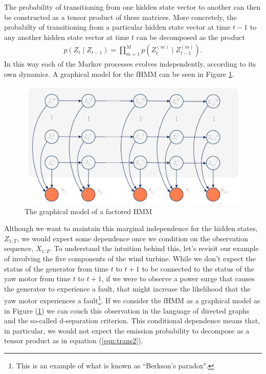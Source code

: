 \documentclass{amsart}
\begin{document}
The probability of transitioning from one hidden state vector to another can 
then be constructed as a tensor product of these matrices.  More concretely, 
the probabilty of transitioning from a particular hidden state vector at time 
$t-1$ to any another hidden state vector at time $t$ can be decomposed as the product
\begin{eqnarray}\label{eqn:trans2}
p(Z_t\mid Z_{t-1}) = \prod_{m=1}^M p(Z_{t}^{(m)} \mid Z_{t-1}^{(m)}).
\end{eqnarray}
In this way each of the Markov processes evolves independently, according to 
its own dynamics. A graphical model for the fHMM can be seen in Figure 
\ref{fig:fHMM}.

\begin{figure}
\centering
\includegraphics[scale=0.1]{figures/fhmm.jpg}
\caption{The graphical model of a factored HMM}\label{fig:fHMM}
\end{figure}

Although we want to maintain this marginal independence for the hidden states, 
$Z_{1:T}$, we would expect some dependence once we condition on the observation 
sequence, $X_{1:T}$.  To understand the intuition behind this, let's revisit our 
example of involving the five components of the wind turbine.  While we don't 
expect the status of the generator from time $t$ to $t+1$ to be connected to 
the status of the yaw motor from time $t$ to $t+1$, if we were to observe a 
power surge that causes the generator to experience a fault, that might 
increase the likelihood that the yaw motor experiences a fault\footnote{This is 
an example of what is known as ``Berkson's paradox".}.  If we consider 
the fHMM as a graphical model as in Figure (\ref{fig:fHMM}) we can couch this 
observation in the language of directed graphs and the so-called d-separation 
criterion. This conditional dependence means that, in particular, we would not expect the 
emission probability to decompose as a tensor product as in equation (\ref{eqn:trans2}). 
\end{document}
